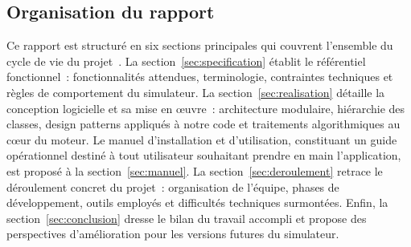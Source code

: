 \subsection{Organisation du rapport}
\label{subsec:organisation}

Ce rapport est structuré en six sections principales qui couvrent l'ensemble du
cycle de vie du projet~\cite{wikibooks2024latex}. La section~\ref{sec:specification} établit le référentiel
fonctionnel~: fonctionnalités attendues, terminologie, contraintes techniques et
règles de comportement du simulateur. La section~\ref{sec:realisation} détaille
la conception logicielle et sa mise en œuvre~: architecture modulaire, hiérarchie
des classes, design patterns appliqués à notre code et traitements
algorithmiques au cœur du moteur. Le manuel d'installation et d'utilisation,
constituant un guide opérationnel destiné à tout utilisateur souhaitant prendre
en main l'application, est proposé à la section~\ref{sec:manuel}. La
section~\ref{sec:deroulement} retrace le déroulement concret du projet~:
organisation de l'équipe, phases de développement, outils employés et difficultés
techniques surmontées. Enfin, la section~\ref{sec:conclusion} dresse le bilan du
travail accompli et propose des perspectives d'amélioration pour les versions
futures du simulateur.
